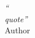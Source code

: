 \cleardoublepage
\thispagestyle{plain}

\vspace*{8cm}

\begin{flushright}
   \textsl{``\\quote''} \\
\vspace*{1.5cm}
            Author
\end{flushright}
